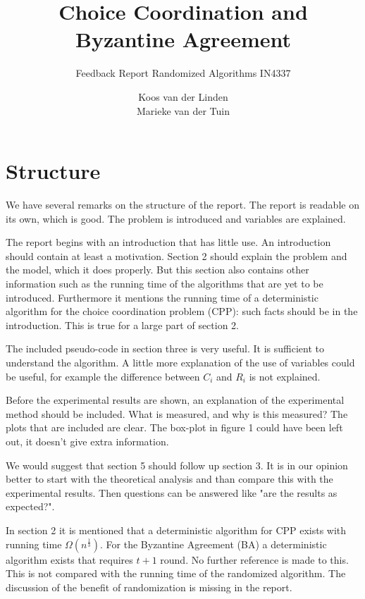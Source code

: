 \documentclass[nocopyrightspace]{acm_proc_article-sp}
\begin{document}
\title{Choice Coordination and Byzantine Agreement}
\subtitle{Feedback Report Randomized Algorithms IN4337}
\author{
\alignauthor
Koos van der Linden \\ 
\alignauthor
Marieke van der Tuin \\ 
}
\maketitle
\section{Structure}
We have several remarks on the structure of the report. The report is readable on its own, which is good. The problem is introduced and variables are explained. 

The report begins with an introduction that has little use. An introduction should contain at least a motivation. Section 2 should explain the problem and the model, which it does properly. But this section also contains other information such as the running time of the algorithms that are yet to be introduced. Furthermore it mentions the running time of a deterministic algorithm for the choice coordination problem (CPP): such facts should be in the introduction. This is true for a large part of section 2. 

The included pseudo-code in section three is very useful. It is sufficient to understand the algorithm. A little more explanation of the use of variables could be useful, for example  the difference between $C_i$ and $R_i$ is not explained.

Before the experimental results are shown, an explanation of the experimental method should be included. What is measured, and why is this measured? The plots that are included are clear. The box-plot in figure 1 could have been left out, it doesn't give extra information.

We would suggest that section 5 should follow up section 3. It is in our opinion better to start with the theoretical analysis and than compare this with the experimental results. Then questions can be answered like "are the results as expected?".

In section 2 it is mentioned that  a deterministic algorithm for CPP exists with running time $\Omega(n^\frac{1}{3})$. For the Byzantine Agreement (BA) a deterministic algorithm exists that requires $t+1$ round. No further reference is made to this. This is not compared with the running time of the randomized algorithm. The discussion of the benefit of randomization is missing in the report. 
\end{document}
